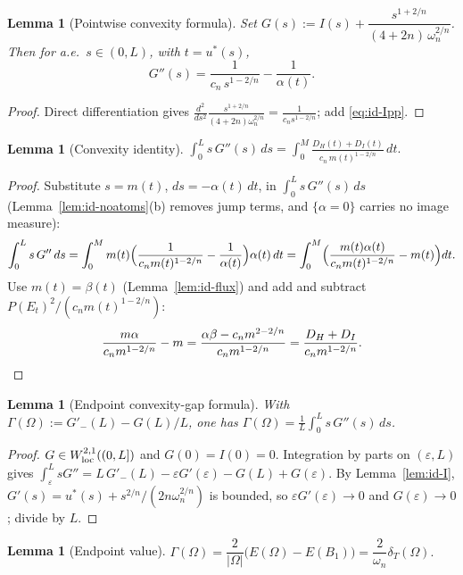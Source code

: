 \documentclass[11pt]{amsart}
\newtheorem{lemma}[theorem]{Lemma}
\theoremstyle{definition}
\newcommand{\Om}{\Omega}
\newcommand{\dT}{\delta_T}
\newcommand{\eps}{\varepsilon}
\newcommand{\Per}{P}
\begin{document}
\begin{lemma}[Pointwise convexity formula]\label{lem:id-Gpp}
Set \(G(s):=I(s)+\dfrac{s^{1+2/n}}{(4+2n)\,\omega_n^{2/n}}\).  Then for a.e.\
\(s\in(0,L)\), with \(t=u^*(s)\),
\[
   G''(s)=\frac{1}{c_n\,s^{1-2/n}}-\frac{1}{\alpha(t)} .
\]
\end{lemma}

\begin{proof}
Direct differentiation gives
\(\frac{d^2}{ds^2}\frac{s^{1+2/n}}{(4+2n)\omega_n^{2/n}}
=\frac{1}{c_n s^{1-2/n}}\); add \eqref{eq:id-Ipp}.
\end{proof}

\begin{lemma}[Convexity identity]\label{lem:id-cov}
\(\displaystyle\int_0^L s\,G''(s)\,ds
   =\int_0^M\frac{D_H(t)+D_I(t)}{c_n\,m(t)^{1-2/n}}\,dt.\)
\end{lemma}

\begin{proof}
Substitute \(s=m(t)\), \(ds=-\alpha(t)\,dt\), in
\(\int_0^L s\,G''(s)\,ds\) (Lemma~\ref{lem:id-noatoms}(b) removes jump terms,
and \(\{\alpha=0\}\) carries no image measure):
\[
   \int_0^L s\,G''\,ds
   =\int_0^M m(t)\Bigl(\frac{1}{c_n m(t)^{1-2/n}}-\frac1{\alpha(t)}\Bigr)
      \alpha(t)\,dt
   =\int_0^M\Bigl(\frac{m(t)\alpha(t)}{c_n m(t)^{1-2/n}}-m(t)\Bigr)dt .
\]
Use \(m(t)=\beta(t)\) (Lemma~\ref{lem:id-flux}) and add and subtract
\(\Per(E_t)^2/(c_n m(t)^{1-2/n})\):
\[
   \frac{m\alpha}{c_n m^{1-2/n}}-m
   =\frac{\alpha\beta-c_n m^{2-2/n}}{c_n m^{1-2/n}}
   =\frac{D_H+D_I}{c_n m^{1-2/n}} . \qedhere
\]
\end{proof}

\begin{lemma}[Endpoint convexity-gap formula]\label{lem:id-gap}
With \(\Gamma(\Om):=G'_-(L)-G(L)/L\), one has
\(\Gamma(\Om)=\frac1L\int_0^L s\,G''(s)\,ds\).
\end{lemma}

\begin{proof}
\(G\in W^{2,1}_{\rm loc}((0,L])\) and \(G(0)=I(0)=0\).  Integration by parts on
\((\eps,L)\) gives \(\int_\eps^L sG''=L\,G'_-(L)-\eps G'(\eps)-G(L)+G(\eps)\).
By Lemma~\ref{lem:id-I},
\(G'(s)=u^*(s)+s^{2/n}/(2n\omega_n^{2/n})\) is bounded, so
\(\eps G'(\eps)\to0\) and \(G(\eps)\to0\); divide by \(L\).
\end{proof}

\begin{lemma}[Endpoint value]\label{lem:id-endpoint}
\(\Gamma(\Om)=\dfrac{2}{|\Om|}\bigl(E(\Om)-E(B_1)\bigr)=\dfrac{2}{\omega_n}\dT(\Om).\)
\end{lemma}
\end{document}
